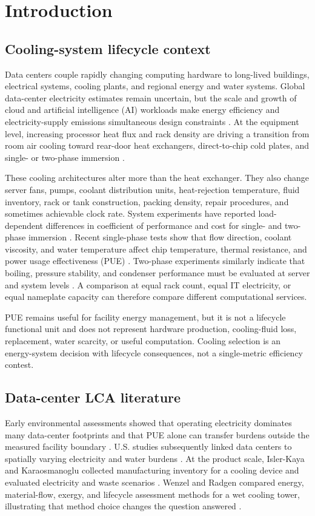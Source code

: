 \documentclass[review,12pt]{elsarticle}
\begin{document}
\section{Introduction}
\subsection{Cooling-system lifecycle context}
Data centers couple rapidly changing computing hardware to long-lived buildings, electrical systems, cooling plants, and regional energy and water systems. Global data-center electricity estimates remain uncertain, but the scale and growth of cloud and artificial intelligence (AI) workloads make energy efficiency and electricity-supply emissions simultaneous design constraints \cite{ref1,ref2}. At the equipment level, increasing processor heat flux and rack density are driving a transition from room air cooling toward rear-door heat exchangers, direct-to-chip cold plates, and single- or two-phase immersion \cite{ref3,ref4,ref5}.

These cooling architectures alter more than the heat exchanger. They also change server fans, pumps, coolant distribution units, heat-rejection temperature, fluid inventory, rack or tank construction, packing density, repair procedures, and sometimes achievable clock rate. System experiments have reported load-dependent differences in coefficient of performance and cost for single- and two-phase immersion \cite{ref6}. Recent single-phase tests show that flow direction, coolant viscosity, and water temperature affect chip temperature, thermal resistance, and power usage effectiveness (PUE) \cite{ref7}. Two-phase experiments similarly indicate that boiling, pressure stability, and condenser performance must be evaluated at server and system levels \cite{ref8}. A comparison at equal rack count, equal IT electricity, or equal nameplate capacity can therefore compare different computational services.

PUE remains useful for facility energy management, but it is not a lifecycle functional unit and does not represent hardware production, cooling-fluid loss, replacement, water scarcity, or useful computation. Cooling selection is an energy-system decision with lifecycle consequences, not a single-metric efficiency contest.

\subsection{Data-center LCA literature}
Early environmental assessments showed that operating electricity dominates many data-center footprints and that PUE alone can transfer burdens outside the measured facility boundary \cite{ref9}. U.S. studies subsequently linked data centers to spatially varying electricity and water burdens \cite{ref10,ref11}. At the product scale, Isler-Kaya and Karaosmanoglu collected manufacturing inventory for a cooling device and evaluated electricity and waste scenarios \cite{ref12}. Wenzel and Radgen compared energy, material-flow, exergy, and lifecycle assessment methods for a wet cooling tower, illustrating that method choice changes the question answered \cite{ref13}.
\end{document}
